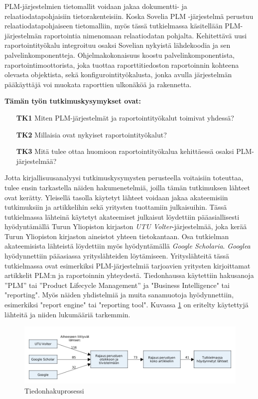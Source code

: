 PLM-järjestelmien tietomallit voidaan jakaa dokumentti- ja relaatiodatapohjaisiin tietorakenteisiin. \cite{david_what_2016} Koska Sovelia PLM -järjestelmä perustuu relaatiodatapohjaiseen tietomalliin, myös tässä tutkielmassa käsitellään PLM-järjestelmän raportointia nimenomaan relaatiodatan pohjalta. Kehitettävä uusi raportointityökalu integroituu osaksi Sovelian nykyistä lähdekoodia ja sen palvelinkomponentteja. Ohjelmakokonaisuus koostu palvelinkomponentista, raportointimoottorista, joka tuottaa raporttitiedoston raportoinnin kohteena olevasta objektista, sekä konfigurointityökalusta, jonka avulla järjestelmän pääkäyttäjä voi muokata raporttien ulkonäköä ja rakennetta.

\textbf{Tämän työn tutkimuskysymykset ovat:}
\begin{itemize}
\item[\textbf{TK1}] Miten PLM-järjestelmät ja raportointityökalut toimivat yhdessä?
\item[\textbf{TK2}] Millaisia ovat nykyiset raportointityökalut?
\item[\textbf{TK3}] Mitä tulee ottaa huomioon raportointityökalua kehittäessä osaksi PLM-järjestelmää?
\end{itemize}

Jotta kirjallisuusanalyysi tutkimuskysymysten perusteella voitaisiin toteuttaa, tulee ensin tarkastella näiden hakumenetelmiä, joilla tämän tutkimuksen lähteet ovat kerätty. Yleisellä tasolla käytetyt lähteet voidaan jakaa akateemisiin tutkimuksiin ja artikkelihin sekä yritysten tuottamiin julkaisuihin. Tässä tutkielmassa lähteinä käytetyt akateemiset julkaisut löydettiin pääasiallisesti hyödyntämällä Turun Yliopiston kirjaston \textit{UTU Volter}-järjestelmää, joka kerää Turun Yliopiston kirjaston aineistot yhteen tietokantaan. Osa tutkielman akateemisista lähteistä löydettiin myös hyödyntämällä \textit{Google Scholaria}. \textit{Googlea} hyödynnettiin pääasiassa yrityslähteiden löytämiseen. Yrityslähteitä tässä tutkielmassa ovat esimerkiksi PLM-järjestelmiä tarjoavien yritysten kirjoittamat artikkelit PLM:n ja raportoinnin yhteydestä. Tiedonhaussa käytettiin hakusanoja ”PLM” tai ”Product Lifecycle Management” ja "Business Intelligence" tai "reporting". Myös näiden yhdistelmiä ja muita sanamuotoja hyödynnettiin, esimerkiksi "report engine" tai "reporting tool". Kuvassa \ref{fig:Lahteet} on eritelty käytettyjä lähteitä ja niiden lukumääriä tarkemmin.

\begin{figure}[tbh]
\includegraphics[width=1\textwidth]{img/lahteet.png}
\caption{Tiedonhakuprosessi\label{fig:Lahteet}}
\end{figure}


